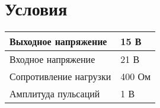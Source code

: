 \chapter{Условия}

    \begin{table}[ht]
	\begin{tabular}{|l|l|}
		\hline
		Выходное напряжение & 15 В \\ \hline
		Входное напряжение & 21 В \\ \hline
		Сопротивление нагрузки & 400 Ом \\ \hline
		Амплитуда пульсаций & 1 В \\ \hline
		
	\end{tabular}
\end{table}
